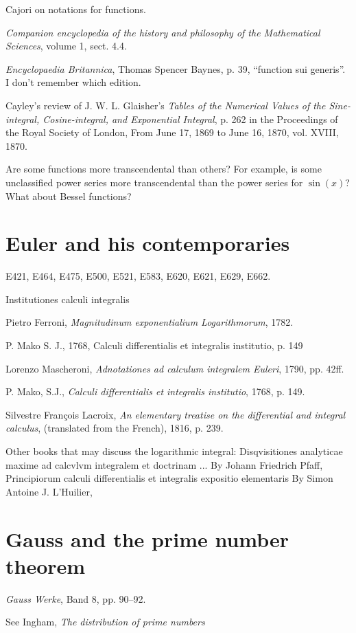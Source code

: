 \documentclass{article}
\begin{document}
Cajori on notations for functions.

{\em Companion encyclopedia of the history and philosophy of the Mathematical Sciences}, volume 1, sect. 4.4.

{\em Encyclopaedia Britannica}, Thomas Spencer Baynes, p. 39, ``function sui generis''. I don't remember which edition.

Cayley's review of J. W. L. Glaisher's {\em Tables of the Numerical Values of the 
Sine-integral, Cosine-integral, and Exponential Integral}, p. 262 in the
Proceedings of the Royal Society of London, From June 17, 1869 to June 16, 1870,
vol. XVIII, 1870.

Are some functions more transcendental than others? For example, is
some unclassified power series more transcendental than the power
series for $\sin(x)$? What about Bessel functions?

\section{Euler and his contemporaries}
E421, E464, E475, E500, E521, E583, E620, E621, E629, E662.

Institutiones calculi integralis

Pietro Ferroni,
{\em Magnitudinum exponentialium Logarithmorum},
1782.

P. Mako S. J., 1768,
Calculi differentialis et integralis institutio,
p. 149

Lorenzo Mascheroni,
{\em Adnotationes ad calculum integralem Euleri},
1790, pp. 42ff.

P. Mako, S.J.,
{\em Calculi differentialis et integralis institutio}, 1768,
p. 149.

Silvestre Fran{\c c}ois Lacroix,
{\em An elementary treatise on the differential and integral calculus},
(translated from the French),
1816, p. 239.

Other books that may discuss the logarithmic integral:
Disqvisitiones analyticae maxime ad calcvlvm integralem et doctrinam ...
 By Johann Friedrich Pfaff, 
Principiorum calculi differentialis et integralis expositio elementaris
 By Simon Antoine J. L'Huilier, 

\section{Gauss and the prime number theorem}
{\em Gauss Werke}, Band 8, pp. 90--92.

See Ingham, {\em The distribution of prime numbers}
\end{document}
